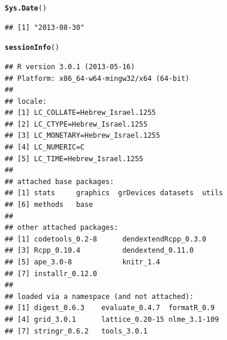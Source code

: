 \documentclass[shortnames,nojss,article]{jss}\usepackage[]{graphicx}\usepackage[]{color}
\makeatletter
\newcommand{\hlstd}[1]{\textcolor[rgb]{0.345,0.345,0.345}{#1}}%
\newcommand{\hlkwd}[1]{\textcolor[rgb]{0.737,0.353,0.396}{\textbf{#1}}}%
\newenvironment{kframe}{%
 \def\at@end@of@kframe{}%
 \ifinner\ifhmode%
  \def\at@end@of@kframe{\end{minipage}}%
  \begin{minipage}{\columnwidth}%
 \fi\fi%
 \def\FrameCommand##1{\hskip\@totalleftmargin \hskip-\fboxsep
 \colorbox{shadecolor}{##1}\hskip-\fboxsep
     \hskip-\linewidth \hskip-\@totalleftmargin \hskip\columnwidth}%
 \MakeFramed {\advance\hsize-\width
   \@totalleftmargin\z@ \linewidth\hsize
   \@setminipage}}%
 {\par\unskip\endMakeFramed%
 \at@end@of@kframe}
\newenvironment{knitrout}{}{} %
\makeatother
\begin{document}
\begin{knitrout}
\color{fgcolor}\begin{kframe}
\begin{alltt}
\hlkwd{Sys.Date}\hlstd{()}
\end{alltt}
\begin{verbatim}
## [1] "2013-08-30"
\end{verbatim}
\begin{alltt}
\hlkwd{sessionInfo}\hlstd{()}
\end{alltt}
\begin{verbatim}
## R version 3.0.1 (2013-05-16)
## Platform: x86_64-w64-mingw32/x64 (64-bit)
## 
## locale:
## [1] LC_COLLATE=Hebrew_Israel.1255 
## [2] LC_CTYPE=Hebrew_Israel.1255   
## [3] LC_MONETARY=Hebrew_Israel.1255
## [4] LC_NUMERIC=C                  
## [5] LC_TIME=Hebrew_Israel.1255    
## 
## attached base packages:
## [1] stats     graphics  grDevices datasets  utils    
## [6] methods   base     
## 
## other attached packages:
## [1] codetools_0.2-8      dendextendRcpp_0.3.0
## [3] Rcpp_0.10.4          dendextend_0.11.0   
## [5] ape_3.0-8            knitr_1.4           
## [7] installr_0.12.0     
## 
## loaded via a namespace (and not attached):
## [1] digest_0.6.3    evaluate_0.4.7  formatR_0.9    
## [4] grid_3.0.1      lattice_0.20-15 nlme_3.1-109   
## [7] stringr_0.6.2   tools_3.0.1
\end{verbatim}
\end{kframe}
\end{knitrout}
\end{document}
